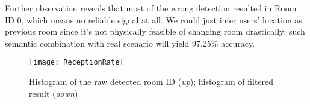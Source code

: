 Further observation reveals that most of the wrong detection resulted in Room ID 0, which means no reliable signal at all. We could just infer users' location as previous room since it's not physically feasible of changing room drastically; such semantic combination with real scenario will yield 97.25\% accuracy.

\begin{figure}
  \centering
  \texttt{[image: ReceptionRate]}
  \caption{Histogram of the raw detected room ID ({\em up}); histogram of filtered result ({\em down})}
  \vspace{-0.3cm}
  \label{fig:reception}
\end{figure}




